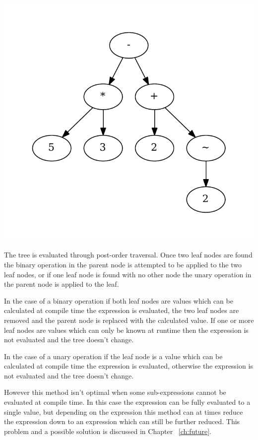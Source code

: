 \begin{center}
\includegraphics[scale=0.5]{graphs/impleval.pdf}
\end{center}


The tree is evaluated through
post-order traversal. Once two leaf nodes are found the binary operation in the parent node
is attempted to be applied to the two leaf nodes, or if one leaf node is found
with no other node the unary operation in the parent node is applied
to the leaf.  

In the case of a binary operation if both leaf nodes are values which
can be calculated at compile time the expression is evaluated, the two leaf nodes
are removed and the parent node is replaced with the calculated value. If one or
more leaf nodes are values which can only be known at runtime then the expression is
not evaluated and the tree doesn't change. 

In the case of a unary operation if the leaf node is a value which can be calculated
at compile time the expression is evaluated, otherwise the expression is not evaluated
and the tree doesn't change.

However this method isn't optimal when some sub-expressions cannot be
evaluated at compile time. In this case the expression can be fully evaluated
to a single value,
but depending on the expression this method can at times reduce the expression
down to an expression which can still be further reduced.
This problem and a possible solution is discussed in Chapter ~\ref{ch:future}.



